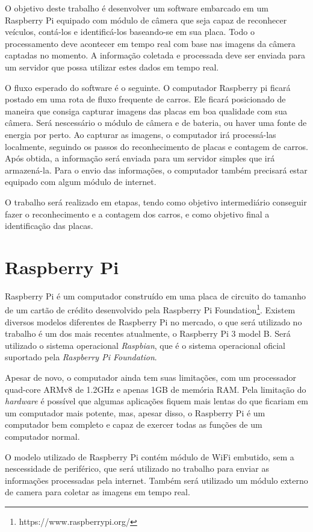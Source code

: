 O objetivo deste trabalho é desenvolver um software embarcado em um Raspberry Pi
equipado com módulo de câmera que seja capaz de reconhecer veículos, contá-los e
identificá-los baseando-se em sua placa. Todo o processamento deve acontecer em
tempo real com base nas imagens da câmera captadas no momento. A informação
coletada e processada deve ser enviada para um servidor que possa utilizar estes
dados em tempo real.

O fluxo esperado do software é o seguinte. O computador Raspberry pi ficará
postado em uma rota de fluxo frequente de carros. Ele ficará posicionado de
maneira que consiga capturar imagens das placas em boa qualidade com sua câmera.
Será nescessário o módulo de câmera e de bateria, ou haver uma fonte de energia
por perto. Ao capturar as imagens, o computador irá processá-las localmente,
seguindo os passos do reconhecimento de placas e contagem de carros.  Após
obtida, a informação será enviada para um servidor simples que irá armazená-la.
Para o envio das informações, o computador também precisará estar equipado com
algum módulo de internet.

O trabalho será realizado em etapas, tendo como objetivo intermediário conseguir
fazer o reconhecimento e a contagem dos carros, e como objetivo final a
identificação das placas.

\section{Raspberry Pi}
\label{sec:raspi}

Raspberry Pi é um computador construído em uma placa de circuito do tamanho de
um cartão de crédito desenvolvido pela Raspberry Pi
Foundation\footnote{https://www.raspberrypi.org/}. Existem diversos modelos diferentes 
de Raspberry Pi no mercado, o que será utilizado no trabalho é um dos mais recentes atualmente, 
o Raspberry Pi 3 model B. Será utilizado o sistema operacional \emph{Raspbian}, que é o 
sistema operacional oficial suportado pela \emph{Raspberry Pi Foundation}.

Apesar de novo, o computador ainda tem suas limitações, com um processador quad-core ARMv8 de 
1.2GHz e apenas 1GB de memória RAM. Pela limitação do \emph{hardware} é possível que algumas 
aplicações fiquem mais lentas do que ficariam em um computador mais potente, mas, apesar disso, 
o Raspberry Pi é um computador bem completo e capaz de exercer todas as funções de um computador normal.

O modelo utilizado de Raspberry Pi contém módulo de WiFi embutido, sem a nescessidade de 
periférico, que será utilizado no trabalho para enviar as informações processadas pela 
internet. Também será utilizado um módulo externo de camera para coletar as imagens em tempo real.

